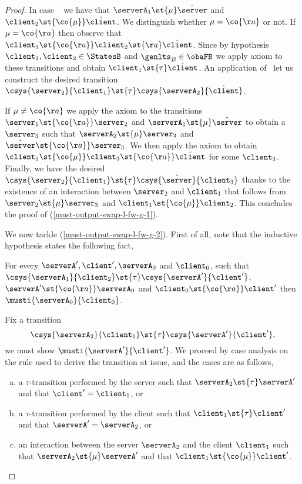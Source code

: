 \begin{proof}
  In case \scom\ %
  we have that $\serverA_1 \st{\mu} \hat{\server}$ and $\client_2 \st{\co{\mu}} \hat{\client}$.
  We distinguish whether $\mu = \co{\aa}$ or not.
  If $\mu = \co{\aa}$ then observe that
  $\client_1 \st{\co{\aa}} \client_2 \st{\aa} \hat{\client}$.
  Since by hypothesis $\client_1,\client_2
  \in \StatesB$ and $\genlts_B \in \obaFB$ we apply 
  \outputfeedback axiom to these transitions and obtain $\client_1 \st{\tau}
  \hat{\client}$. An application of \scom\ let us construct
  the desired transition $\csys{\server_2}{\client_1} \st{\tau}
  \csys{\serverA_2}{\hat{\client}}$.

  
  If $\mu \neq \co{\aa}$ we apply the \outputconfluence axiom to the transitions
  $\server_1 \st{\co{\aa}} \server_2$ and $\serverA_1 \st{\mu} \hat{\server}$
  to obtain a $\server_3$ such that
  $\serverA_2 \st{\mu} \server_3$ and $\hat{\server} \st{\co{\aa}} \server_3$.
  We then apply the \outputcommutativity axiom to obtain
  $\client_1 \st{\co{\mu}} \client_3 \st{\co{\aa}} \hat{\client}$ for
  some $\client_3$.
  Finally, we have the desired $\csys{\server_2}{\client_1} \st{\tau} \csys{\hat{\server}}{\client_3}$
  thanks to the existence of an interaction between $\server_2$ and $\client_1$
  that follows from
  $\server_2 \st{\mu} \server_3$ and $\client_1 \st{\co{\mu}} \client_2$.
  This concludes the proof of  (\ref{must-output-swap-l-fw-g-1}).



  We now tackle (\ref{must-output-swap-l-fw-g-2}). First of all,
  note that the inductive hypothesis states the following fact,
  \begin{center}
  For every
  $\serverA', \client', \serverA_0$ and $\client_0$,
  such that
  $\csys{\serverA_1}{\client_2}\st{\tau}\csys{\serverA'}{\client'}$,
  $\serverA'\st{\co{\aa}}\serverA_0$
  and
  $\client_0\st{\co{\aa}}\client'$
  then
  $\musti{\serverA_0}{\client_0}$.
  \end{center}
  
  Fix a transition
  $$
  \csys{\serverA_2}{\client_1} \st{\tau} \csys{\serverA'}{\client'},
  $$
  we must show $\musti{\serverA'}{\client'}$.
  We proceed by case analysis on the rule used to derive the
  transition at issue, and the cases are as follows,
  \begin{enumerate}[(a)]
  \item
    \label{must-output-swap-l-fw-g-2-1}
    a $\tau$-transition performed by the server such that
    $\serverA_2 \st{\tau} \serverA'$ and that $\client' = \client_1$, or
  \item
    \label{must-output-swap-l-fw-g-2-2}
    a $\tau$-transition performed by the client such that
    $\client_1 \st{\tau} \client'$ and that $\serverA' = \serverA_2$, or
  \item
    \label{must-output-swap-l-fw-g-2-3}
    an interaction between the server $\serverA_2$ and the client
    $\client_1$ such that
    $\serverA_2 \st{\mu} \serverA'$
    and that 
    $\client_1 \st{\co{\mu}} \client'$.
  \end{enumerate}


\end{proof}
